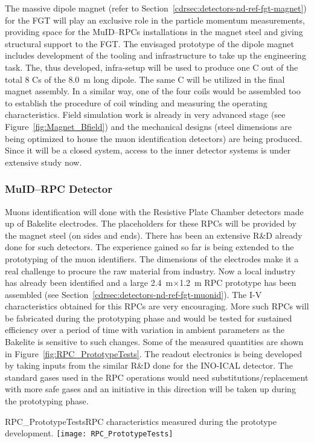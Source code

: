The massive dipole magnet (refer to
Section~\ref{cdrsec:detectors-nd-ref-fgt-magnet}) for the FGT will
play an exclusive role in the particle momentum measurements,
providing space for the MuID--RPCs installations in the magnet steel
and giving structural support to the FGT. The envisaged prototype of
the dipole magnet includes development of the tooling and
infrastructure to take up the engineering task.  The, thus developed,
infra-setup will be used to produce one C out of the total 8 Cs of the
8.0~m long dipole.  The same C will be utilized in the final magnet
assembly. In a similar way, one of the four coils would be assembled
too to establish the procedure of coil winding and measuring the
operating characteristics.  Field simulation work is already in very
advanced stage (see Figure~\ref{fig:Magnet_Bfield}) and the mechanical
designs (steel dimensions are being optimized to house the muon
identification detectors) are being produced.  Since it will be a
closed system, access to the inner detector systems is under extensive
study now.


\subsubsection{MuID--RPC Detector}


Muons identification will done with the Resistive Plate Chamber
detectors made up of Bakelite electrodes.  The placeholders for these
RPCs will be provided by the magnet steel (on sides and ends). There
has been an extensive R\&D already done for such detectors. The
experience gained so far is being extended to the prototyping of the
muon identifiers. The dimensions of the electrodes make it a real
challenge to procure the raw material from industry. Now a local
industry has already been identified and a large 2.4~m$\times$1.2~m
RPC prototype has been assembled (see
Section~\ref{cdrsec:detectors-nd-ref-fgt-muonid}). The I-V
characteristics obtained for this RPCs are very encouraging. More such
RPCs will be fabricated during the prototyping phase and would be
tested for sustained efficiency over a period of time with variation
in ambient parameters as the Bakelite is sensitive to such
changes. Some of the measured quantities are shown in
Figure~\ref{fig:RPC_PrototypeTests}.  The readout electronics is being
developed by taking inputs from the similar R\&D done for the INO-ICAL
detector. The standard gases used in the RPC operations would need
substitutions/replacement with more safe gases and an initiative in
this direction will be taken up during the prototyping phase.
\begin{cdrfigure}
{RPC_PrototypeTests}{RPC characteristics measured during the prototype development.}
\texttt{[image: RPC\_PrototypeTests]}
\end{cdrfigure}



